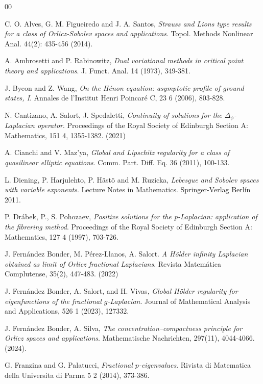 \documentclass[leqno,twoside, 12pt]{amsart}
\theoremstyle{plain}
\numberwithin{equation}{section} \numberwithin{figure}{section}
\theoremstyle{definition}
\numberwithin{equation}{section}
\begin{document}
\begin{thebibliography}{00}


 C. O. Alves, G. M. Figueiredo and J. A. Santos, \emph{Strauss and Lions type results for a class of Orlicz-Sobolev spaces and applications}. Topol. Methods Nonlinear Anal. 44(2): 435-456 (2014). 

 A. Ambrosetti and P. Rabinowitz, \emph{Dual variational methods in critical point theory and applications}. J. Funct. Anal. 14 (1973), 349-381.

J. Byeon and  Z. Wang, \emph{On the Hénon equation: asymptotic profile of ground states, I}. Annales de l'Institut Henri Poincaré C, 23 6 (2006), 803-828.

 N. Cantizano, A. Salort, J. Spedaletti,  \emph{Continuity of solutions for the $\Delta_\phi$-Laplacian operator}. Proceedings of the Royal Society of Edinburgh Section A: Mathematics, 151 4, 1355-1382. (2021)

 A. Cianchi and V. Maz'ya, \emph{Global and Lipschitz regularity for a class of quasilinear elliptic equations}. Comm. Part. Diff. Eq. 36 (2011), 100-133.

 L. Diening, P. Harjulehto, P. H\"{a}st\"{o} and M. Ruzicka, \emph{Lebesgue and Sobolev spaces with variable exponents}. Lecture Notes in Mathematics. Springer-Verlag Berl\'in 2011. 

P. Dr\'abek, P.,   S. Pohozaev, \emph{Positive solutions for the p-Laplacian: application of the fibrering method}. Proceedings of the Royal Society of Edinburgh Section A: Mathematics, 127 4 (1997), 703-726.

J. Fern\'andez Bonder, M. P\'erez-Llanos, A. Salort.  \emph{A H\"older infinity Laplacian obtained as limit of Orlicz fractional Laplacians}. Revista Matemática Complutense, 35(2), 447-483. (2022)


 J. Fern\'andez Bonder, A. Salort, and H. Vivas, \emph{Global H\"{o}lder regularity for eigenfunctions of the fractional $g$-Laplacian}.
Journal of Mathematical Analysis and Applications,
526 1 (2023), 127332.

J. Fern\'andez Bonder,  A. Silva, \emph{The concentration–compactness principle for Orlicz spaces and applications}. Mathematische Nachrichten, 297(11), 4044-4066.  (2024).

  G. Franzina and G. Palatucci, \emph{Fractional $p$-eigenvalues}. Rivista di Matematica della Universita di Parma 5 2 (2014), 373-386.


\end{thebibliography}
\end{document}
